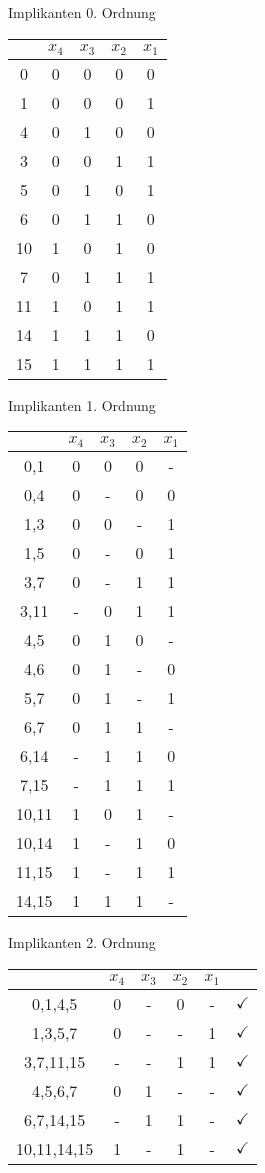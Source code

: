 \documentclass{article}
\begin{document}
\section{}
\subsection{}
Implikanten 0. Ordnung

\begin{tabular}{c||cccc}
    &$x_4$&$x_3$&$x_2$&$x_1$\\
    \hline\hline
    0&0&0&0&0\\
    1&0&0&0&1\\
    4&0&1&0&0\\
    \hline\hline
    3&0&0&1&1\\
    5&0&1&0&1\\
    6&0&1&1&0\\
    10&1&0&1&0\\
    \hline\hline
    7&0&1&1&1\\
    11&1&0&1&1\\
    14&1&1&1&0\\
    \hline\hline
    15&1&1&1&1
\end{tabular}

Implikanten 1. Ordnung

\begin{tabular}{c||cccc}
    &$x_4$&$x_3$&$x_2$&$x_1$\\
    \hline\hline
    0,1&0&0&0&-\\
    0,4&0&-&0&0\\
    1,3&0&0&-&1\\
    1,5&0&-&0&1\\
    3,7&0&-&1&1\\
    3,11&-&0&1&1\\
    4,5&0&1&0&-\\
    4,6&0&1&-&0\\
    5,7&0&1&-&1\\
    6,7&0&1&1&-\\
    6,14&-&1&1&0\\
    7,15&-&1&1&1\\
    10,11&1&0&1&-\\
    10,14&1&-&1&0\\
    11,15&1&-&1&1\\
    14,15&1&1&1&-
\end{tabular}

Implikanten 2. Ordnung

\begin{tabular}{c||ccccl}
    &$x_4$&$x_3$&$x_2$&$x_1$\\
    \hline\hline
    0,1,4,5&0&-&0&-&$\checkmark$\\
    1,3,5,7&0&-&-&1&$\checkmark$\\
    3,7,11,15&-&-&1&1&$\checkmark$\\
    4,5,6,7&0&1&-&-&$\checkmark$\\
    6,7,14,15&-&1&1&-&$\checkmark$\\
    10,11,14,15&1&-&1&-&$\checkmark$
\end{tabular}
\end{document}
